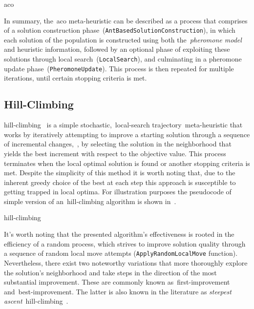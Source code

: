 \begin{algorithm}
  
  \caption{\acrlong{aco}}
  \label{algorithm:aco}
\end{algorithm}

In summary, the~\acrshort{aco} meta-heuristic can be described as a process that
comprises of a solution construction
phase~(\texttt{AntBasedSolutionConstruction}), in which each solution
of the population is constructed using both the~\textit{pheromone model} and
heuristic information, followed by an optional phase of exploiting these
solutions through local search~(\texttt{LocalSearch}), and culminating
in a pheromone update phase~(\texttt{PheromoneUpdate}). This process is
then repeated for multiple iterations, until certain stopping criteria is met.

\subsection{Hill-Climbing}
\label{subsec:hill-climbing}

\acrfull{hill-climbing}~\cite{luke2013essentialsa,vieira2009uma} is a simple
stochastic,~\acrshort{local-search} trajectory~\acrshort{meta-heuristic} that
works by iteratively attempting to improve a starting solution through a
sequence of incremental changes,~\ie{}, by selecting the solution in the
neighborhood that yields the best increment with respect to the objective value.
This process terminates when the local optimal solution is found or another
stopping criteria is met. Despite the simplicity of this method it is worth
noting that, due to the inherent greedy choice of the best at each step this
approach is susceptible to getting trapped in local optima. For illustration
purposes the pseudocode of simple version of an~\acrshort{hill-climbing}
algorithm is shown in~.

\begin{algorithm}
  
  \caption{\acrlong{hill-climbing}}
  \label{algorithm:hill-climbing}
\end{algorithm}

It's worth noting that the presented algorithm's effectiveness is rooted in the
efficiency of a random process, which strives to improve solution quality
through a sequence of random local move attempts (\texttt{ApplyRandomLocalMove} function).
Nevertheless, there exist two noteworthy variations that more thoroughly explore
the solution's neighborhood and take steps in the direction of the most
substantial improvement. These are commonly known as~\acrfull{first-improvement}
and~\acrfull{best-improvement}. The latter is also known in the literature as
\textit{steepest ascent}~\acrshort{hill-climbing}~\cite{luke2013essentialsa}.


